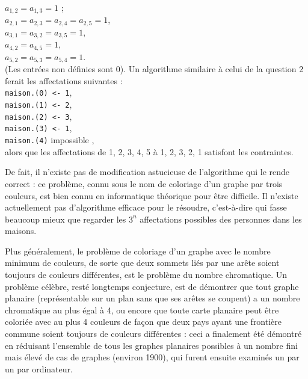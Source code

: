 $a_{1,2}=a_{1,3}=1$ ;\\
$a_{2,1}=a_{2,3}=a_{2,4}=a_{2,5}=1$,\\
$a_{3,1}=a_{3,2}=a_{3,5}=1$,\\
$a_{4,2}=a_{4,5}=1$,\\
$a_{5,2}=a_{5,3}=a_{5,4}=1$.\\
(Les entrées non définies sont 0). Un algorithme similaire à celui de la question 2 ferait les affectations suivantes :\\
\texttt{maison.(0) <- 1},\\
\texttt{maison.(1) <- 2},\\
\texttt{maison.(2) <- 3},\\
\texttt{maison.(3) <- 1},\\
\texttt{maison.(4)} \og impossible \fg{},\\
alors que les affectations de 1, 2, 3, 4, 5 à 1, 2, 3, 2, 1 satisfont les contraintes.
\medskip

De fait, il n'existe pas de modification astucieuse de l'algorithme qui le rende correct : ce problème, connu sous le nom de coloriage d'un graphe par trois couleurs, est bien connu en informatique théorique pour être difficile. Il n'existe actuellement pas d'algorithme efficace pour le résoudre, c'est-à-dire qui fasse beaucoup mieux que regarder les $3^n$ affectations possibles des personnes dans les maisons.
\medskip

Plus généralement, le problème de coloriage d'un graphe avec le nombre minimum de couleurs, de sorte que deux sommets liés par une arête soient toujours de couleurs différentes, est le problème du nombre chromatique. Un problème célèbre, resté longtemps conjecture, est de démontrer que tout graphe planaire (représentable sur un plan sans que ses arêtes se coupent) a un nombre chromatique au plus égal à 4, ou encore que toute carte planaire peut être coloriée avec au plus 4 couleurs de façon que deux pays ayant une frontière commune soient toujours de couleurs différentes : ceci a finalement été démontré en réduisant l'ensemble de tous les graphes planaires possibles à un nombre fini mais élevé de cas de graphes (environ 1900), qui furent ensuite examinés un par un par ordinateur.
\bigskip

\Fin
